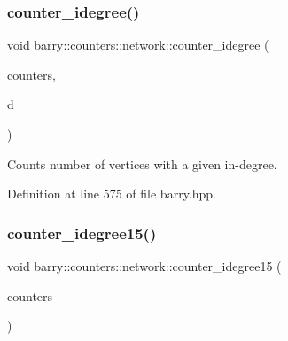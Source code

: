 \mbox{\label{namespacebarry_1_1counters_1_1network_ab87617883960a1fc818048036fb13b83}} 
\subsubsection{\texorpdfstring{counter\+\_\+idegree()}{counter\_idegree()}}
{\footnotesize\ttfamily void barry\+::counters\+::network\+::counter\+\_\+idegree (\begin{DoxyParamCaption}\item[{\hyperlink{namespacebarry_1_1counters_1_1network_a3b3c590303d47840d1967372ae495d95}{Net\+Counter\+Vector} $\ast$}]{counters,  }\item[{std\+::vector$<$ \hyperlink{namespacebarry_a11dfc53ddb4672278319aa04f1e09a6c}{uint} $>$}]{d }\end{DoxyParamCaption})\hspace{0.3cm}{\ttfamily [inline]}}



Counts number of vertices with a given in-\/degree. 



Definition at line 575 of file barry.\+hpp.

\mbox{\label{namespacebarry_1_1counters_1_1network_a148e6fbb549eea53ff6d744b0f683ed6}} 
\subsubsection{\texorpdfstring{counter\+\_\+idegree15()}{counter\_idegree15()}}
{\footnotesize\ttfamily void barry\+::counters\+::network\+::counter\+\_\+idegree15 (\begin{DoxyParamCaption}\item[{\hyperlink{namespacebarry_1_1counters_1_1network_a3b3c590303d47840d1967372ae495d95}{Net\+Counter\+Vector} $\ast$}]{counters }\end{DoxyParamCaption})\hspace{0.3cm}{\ttfamily [inline]}}




